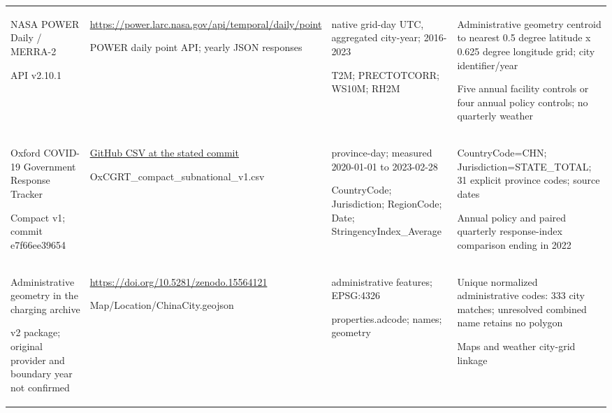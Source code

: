 \begin{longtable}{@{}>{\raggedright\arraybackslash}p{33mm}>{\raggedright\arraybackslash}p{42mm}>{\raggedright\arraybackslash}p{35mm}>{\raggedright\arraybackslash}p{42mm}@{}}
NASA POWER Daily /\allowbreak{} MERRA-2\par API v2.10.1 & \url{https://power.larc.nasa.gov/api/temporal/daily/point}\par POWER daily point API; yearly JSON responses & native grid-day UTC, aggregated city-year; 2016-2023\par T2M; PRECTOTCORR; WS10M; RH2M & Administrative geometry centroid to nearest 0.5 degree latitude x 0.625 degree longitude grid; city identifier/\allowbreak{}year\par Five annual facility controls or four annual policy controls; no quarterly weather\\[3pt]
Oxford COVID-19 Government Response Tracker\par Compact v1; commit e7f66ee39654 & \href{https://raw.githubusercontent.com/OxCGRT/covid-policy-dataset/e7f66ee39654293b5c068efd2f195bd591dc27f6/data/OxCGRT_compact_subnational_v1.csv}{GitHub CSV at the stated commit}\par OxCGRT\_\allowbreak{}compact\_\allowbreak{}subnational\_\allowbreak{}v1.csv & province-day; measured 2020-01-01 to 2023-02-28\par CountryCode; Jurisdiction; RegionCode; Date; StringencyIndex\_\allowbreak{}Average & CountryCode=CHN; Jurisdiction=STATE\_\allowbreak{}TOTAL; 31 explicit province codes; source dates\par Annual policy and paired quarterly response-index comparison ending in 2022\\[3pt]
Administrative geometry in the charging archive\par v2 package; original provider and boundary year not confirmed & \url{https://doi.org/10.5281/zenodo.15564121}\par Map/\allowbreak{}Location/\allowbreak{}ChinaCity.geojson & 372 administrative features; EPSG:4326\par properties.adcode; names; geometry & Unique normalized administrative codes: 333 city matches; unresolved combined name retains no polygon\par Maps and weather city-grid linkage\\[3pt]
\end{longtable}\endgroup
